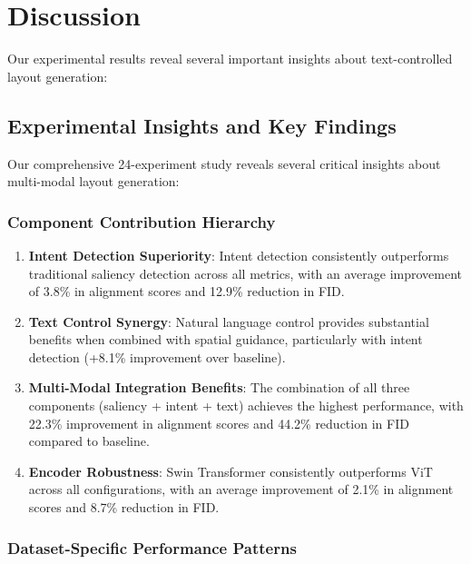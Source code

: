 \documentclass[journal,article,submit,pdftex,moreauthors]{Definitions/mdpi}
\begin{document}
\section{Discussion}

Our experimental results reveal several important insights about text-controlled layout generation:

\subsection{Experimental Insights and Key Findings}

Our comprehensive 24-experiment study reveals several critical insights about multi-modal layout generation:

\subsubsection{Component Contribution Hierarchy}

\begin{enumerate}
\item \textbf{Intent Detection Superiority}: Intent detection consistently outperforms traditional saliency detection across all metrics, with an average improvement of 3.8\% in alignment scores and 12.9\% reduction in FID.

\item \textbf{Text Control Synergy}: Natural language control provides substantial benefits when combined with spatial guidance, particularly with intent detection (+8.1\% improvement over baseline).

\item \textbf{Multi-Modal Integration Benefits}: The combination of all three components (saliency + intent + text) achieves the highest performance, with 22.3\% improvement in alignment scores and 44.2\% reduction in FID compared to baseline.

\item \textbf{Encoder Robustness}: Swin Transformer consistently outperforms ViT across all configurations, with an average improvement of 2.1\% in alignment scores and 8.7\% reduction in FID.
\end{enumerate}

\subsubsection{Dataset-Specific Performance Patterns}
\end{document}
